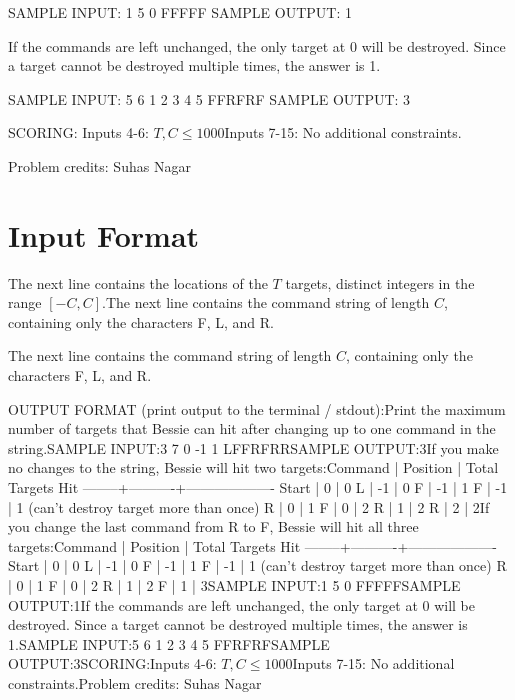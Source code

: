 \documentclass[12pt]{article}
\begin{document}
SAMPLE INPUT:
1 5
0
FFFFF
SAMPLE OUTPUT: 
1

If the commands are left unchanged, the only target at 0 will be destroyed.
Since a target cannot be destroyed multiple times, the answer is 1.

SAMPLE INPUT:
5 6
1 2 3 4 5
FFRFRF
SAMPLE OUTPUT: 
3

SCORING:
Inputs 4-6: $T,C \le 1000$Inputs 7-15: No additional constraints.


Problem credits: Suhas Nagar



\section*{Input Format}
The next line contains the locations of the $T$ targets, distinct integers in the range
$[-C,C]$.The next line contains the command string of length $C$, containing only the
characters F, L, and R.

The next line contains the command string of length $C$, containing only the
characters F, L, and R.

OUTPUT FORMAT (print output to the terminal / stdout):Print the maximum number of targets that Bessie can hit after changing up to one
command  in the string.SAMPLE INPUT:3 7
0 -1 1
LFFRFRRSAMPLE OUTPUT:3If you make no changes to the string, Bessie will hit two targets:Command | Position | Total Targets Hit
--------+----------+-------------------
Start   |  0       | 0 
L       | -1       | 0
F       | -1       | 1
F       | -1       | 1 (can't destroy target more than once)
R       |  0       | 1
F       |  0       | 2
R       |  1       | 2
R       |  2       | 2If you change the last command from R to F, Bessie will hit all three targets:Command | Position | Total Targets Hit
--------+----------+-------------------
Start   |  0       | 0 
L       | -1       | 0
F       | -1       | 1
F       | -1       | 1 (can't destroy target more than once)
R       |  0       | 1
F       |  0       | 2
R       |  1       | 2
F       |  1       | 3SAMPLE INPUT:1 5
0
FFFFFSAMPLE OUTPUT:1If the commands are left unchanged, the only target at 0 will be destroyed.
Since a target cannot be destroyed multiple times, the answer is 1.SAMPLE INPUT:5 6
1 2 3 4 5
FFRFRFSAMPLE OUTPUT:3SCORING:Inputs 4-6: $T,C \le 1000$Inputs 7-15: No additional constraints.Problem credits: Suhas Nagar
\end{document}
